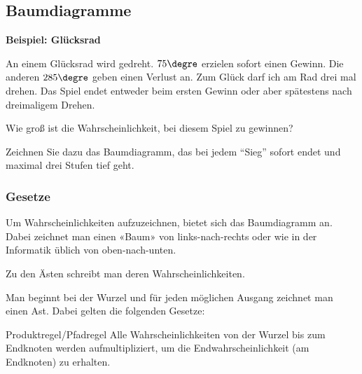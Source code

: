 \subsection{Baumdiagramme}

\textbf{Beispiel: Glücksrad}

An einem Glücksrad wird gedreht. $75\degre$ erzielen sofort einen Gewinn. Die anderen $285\degre$ geben einen Verlust an. Zum Glück darf ich am Rad drei mal drehen. Das Spiel endet entweder beim ersten Gewinn oder aber spätestens nach dreimaligem Drehen.

Wie groß ist die Wahrscheinlichkeit, bei diesem Spiel zu gewinnen?

Zeichnen Sie dazu das Baumdiagramm, das bei jedem ``Sieg'' sofort endet und
maximal drei Stufen tief geht.



\subsubsection{Gesetze}
Um Wahrscheinlichkeiten aufzuzeichnen, bietet sich das Baumdiagramm an.
Dabei zeichnet man einen «Baum» von links-nach-rechts oder wie in der Informatik üblich von oben-nach-unten.

Zu den Ästen schreibt man deren Wahrscheinlichkeiten.

Man beginnt bei der Wurzel und für jeden möglichen Ausgang zeichnet man einen Ast. Dabei gelten die folgenden Gesetze:



\begin{gesetz}{Produktregel/Pfadregel}{}\label{experimentePfadUndSummenregel}
Alle Wahrscheinlichkeiten von der Wurzel bis zum Endknoten werden aufmultipliziert, um die Endwahrscheinlichkeit (am Endknoten) zu erhalten.
\end{gesetz}

